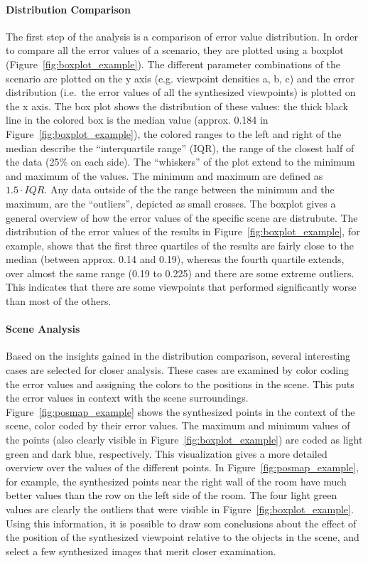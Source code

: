 \paragraph{Distribution Comparison}
The first step of the analysis is a comparison of error value distribution. In order to compare all the error values of a scenario, they are plotted using a boxplot (Figure~\ref{fig:boxplot_example}). The different parameter combinations of the scenario are plotted on the y axis (e.g. viewpoint densities a, b, c) and the error distribution (i.e.\ the error values of all the synthesized viewpoints) is plotted on the x axis. The box plot shows the distribution of these values: the thick black line in the colored box is the median value (approx. 0.184 in Figure~\ref{fig:boxplot_example}), the colored ranges to the left and right of the median describe the ``interquartile range'' (IQR), the range of the closest half of the data (25\% on each side). The ``whiskers'' of the plot extend to the minimum and maximum of the values. The minimum and maximum are defined as $1.5\cdot IQR$. Any data outside of the the range between the minimum and the maximum, are the ``outliers'', depicted as small crosses. The boxplot gives a general overview of how the error values of the specific scene are distrubute. The distribution of the error values of the results in Figure~\ref{fig:boxplot_example}, for example, shows that the first three quartiles of the results are fairly close to the median (between approx. 0.14 and 0.19), whereas the fourth quartile extends, over almost the same range (0.19 to 0.225) and there are some extreme outliers. This indicates that there are some viewpoints that performed significantly worse than most of the others.

\paragraph{Scene Analysis}
Based on the insights gained in the distribution comparison, several interesting cases are selected for closer analysis. These cases are examined by color coding the error values and assigning the colors to the positions in the scene. This puts the error values in context with the scene surroundings. Figure~\ref{fig:posmap_example} shows the synthesized points in the context of the scene, color coded by their error values. The maximum and minimum values of the points (also clearly visible in Figure~\ref{fig:boxplot_example}) are coded as light green and dark blue, respectively. This visualization gives a more detailed overview over the values of the different points. In Figure~\ref{fig:posmap_example}, for example, the synthesized points near the right wall of the room have much better values than the row on the left side of the room. The four light green values are clearly the outliers that were visible in Figure~\ref{fig:boxplot_example}. Using this information, it is possible to draw som conclusions about the effect of the position of the synthesized viewpoint relative to the objects in the scene, and select a few synthesized images that merit closer examination.

